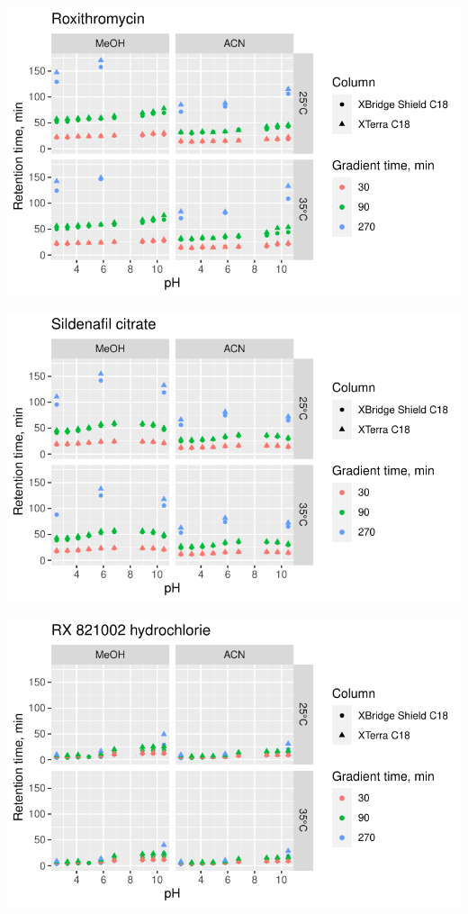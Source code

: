 \documentclass[
  letterpaper,
  DIV=11,
  numbers=noendperiod]{scrreprt}
\begin{document}
\includegraphics{index_files/figure-pdf/unnamed-chunk-4-165.pdf}

\includegraphics{index_files/figure-pdf/unnamed-chunk-4-166.pdf}

\includegraphics{index_files/figure-pdf/unnamed-chunk-4-167.pdf}
\end{document}
